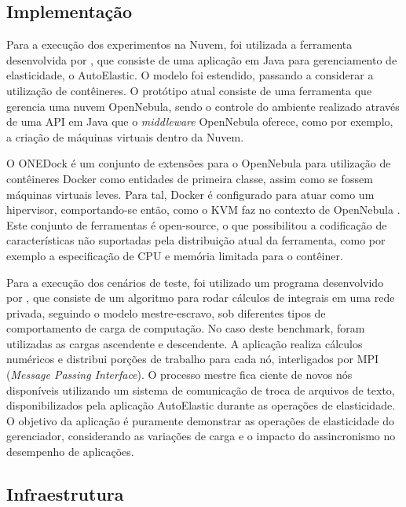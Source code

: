 \documentclass[twoside,english,brazilian]{UNISINOSartigo}
\begin{document}
\subsection{Implementação}
\label{prototype}

Para a execução dos experimentos na Nuvem, foi utilizada a ferramenta desenvolvida por , que consiste de uma aplicação em Java para gerenciamento de elasticidade, o AutoElastic. O modelo foi estendido, passando a considerar a utilização de contêineres. O protótipo atual consiste de uma ferramenta que gerencia uma nuvem OpenNebula, sendo o controle do ambiente realizado através de uma API em Java que o \textit{middleware} OpenNebula oferece, como por exemplo, a criação de máquinas virtuais dentro da Nuvem. 

O ONEDock é um conjunto de extensões para o OpenNebula para utilização de contêineres Docker como entidades de primeira classe, assim como se fossem máquinas virtuais leves. Para tal, Docker é configurado para atuar como um hipervisor, comportando-se então, como o KVM faz no contexto de OpenNebula \cite{onedock2015}. Este conjunto de ferramentas é open-source, o que possibilitou a codificação de características não suportadas pela distribuição atual da ferramenta, como por exemplo a especificação de CPU e memória limitada para o contêiner.

Para a execução dos cenários de teste, foi utilizado um programa desenvolvido por , que consiste de um algoritmo para rodar cálculos de integrais em uma rede privada, seguindo o modelo mestre-escravo, sob diferentes tipos de comportamento de carga de computação. No caso deste benchmark, foram utilizadas as cargas ascendente e descendente. A aplicação realiza cálculos numéricos e distribui porções de trabalho para cada nó, interligados por MPI (\textit{Message Passing Interface}). O processo mestre fica ciente de novos nós disponíveis utilizando um sistema de comunicação de troca de arquivos de texto, disponibilizados pela aplicação AutoElastic durante as operações de elasticidade. O objetivo da aplicação é puramente demonstrar as operações de elasticidade do gerenciador, considerando as variações de carga e o impacto do assincronismo no desempenho de aplicações.

\subsection{Infraestrutura}
\end{document}
